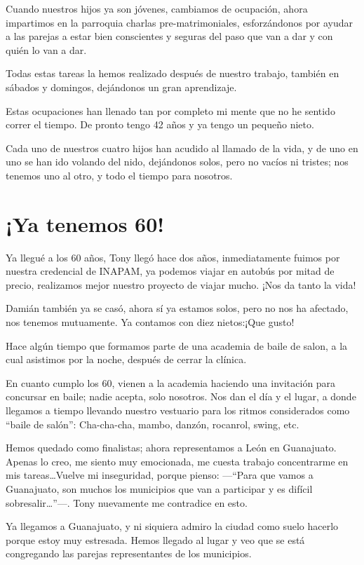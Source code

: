 \documentclass[letterpaper, 12pt]{book}
\begin{document}
Cuando nuestros hijos ya son jóvenes, cambiamos de ocupación, ahora impartimos en la parroquia charlas pre-matrimoniales, esforzándonos por ayudar a las parejas a estar bien conscientes y seguras del paso que van a dar y con quién lo van a dar.

Todas estas tareas la hemos realizado después de nuestro trabajo, también en sábados y domingos, dejándonos un gran aprendizaje.

Estas ocupaciones han llenado tan por completo mi mente que no he sentido correr el tiempo. De pronto tengo 42 años y ya tengo un pequeño nieto.

Cada uno de nuestros cuatro hijos han acudido al llamado de la vida, y de uno en uno se han ido volando del nido, dejándonos solos, pero no vacíos ni tristes; nos tenemos uno al otro, y todo el tiempo para nosotros.

\chapter{¡Ya tenemos 60!}
Ya llegué a los 60 años, Tony llegó hace dos años, inmediatamente fuimos por nuestra credencial de INAPAM, ya podemos viajar en autobús por mitad de precio, realizamos mejor nuestro proyecto de viajar mucho. ¡Nos da tanto la vida!

Damián también ya se casó, ahora sí ya estamos solos, pero no nos ha afectado, nos tenemos mutuamente. Ya contamos con diez nietos:¡Que gusto!  

Hace algún tiempo que formamos parte de una academia de baile de salon, a la cual asistimos por la noche, después de cerrar la clínica.

En cuanto cumplo los 60, vienen a la academia haciendo una invitación para concursar en baile; nadie acepta, solo nosotros. Nos dan el día y el lugar, a donde llegamos a tiempo llevando nuestro vestuario para los ritmos considerados como ``baile de salón'': Cha-cha-cha, mambo, danzón, rocanrol, swing, etc.

Hemos quedado como finalistas; ahora representamos a León en Guanajuato.  Apenas lo creo, me siento muy emocionada, me cuesta trabajo concentrarme en mis tareas\ldots Vuelve mi inseguridad, porque pienso: ---``Para que vamos a Guanajuato, son muchos los municipios que van a participar y es difícil sobresalir\ldots''---. Tony nuevamente me contradice en esto. 

Ya llegamos a Guanajuato, y ni siquiera admiro la ciudad como suelo hacerlo porque estoy muy estresada. Hemos llegado al lugar y veo que se está congregando las parejas representantes de los municipios.
\end{document}
